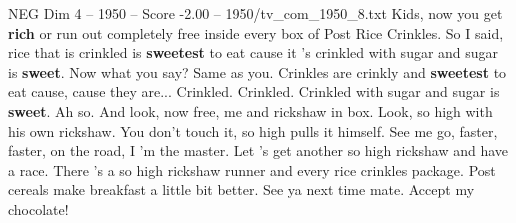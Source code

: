 \begin{textsample}{NEG Dim 4 – 1950 – Score -2.00 – 1950/tv\_com\_1950\_8.txt}  \label{ex:f4_neg_020}
Kids, now you get \textbf{rich} or run out completely free inside every box of Post Rice Crinkles.
So I said, rice that is crinkled is \textbf{sweetest} to eat cause it 's crinkled with sugar and sugar is \textbf{sweet}.
Now what you say?
Same as you.
Crinkles are crinkly and \textbf{sweetest} to eat cause, cause they are...
Crinkled.
Crinkled.
Crinkled with sugar and sugar is \textbf{sweet}.
Ah so.
And look, now free, me and rickshaw in box.
Look, so high with his own rickshaw.
You don't touch it, so high pulls it himself.
See me go, faster, faster, on the road, I 'm the master.
Let 's get another so high rickshaw and have a race.
There 's a so high rickshaw runner and every rice crinkles package.
Post cereals make breakfast a little bit better.
See ya next time mate.
Accept my chocolate!

\end{textsample}
